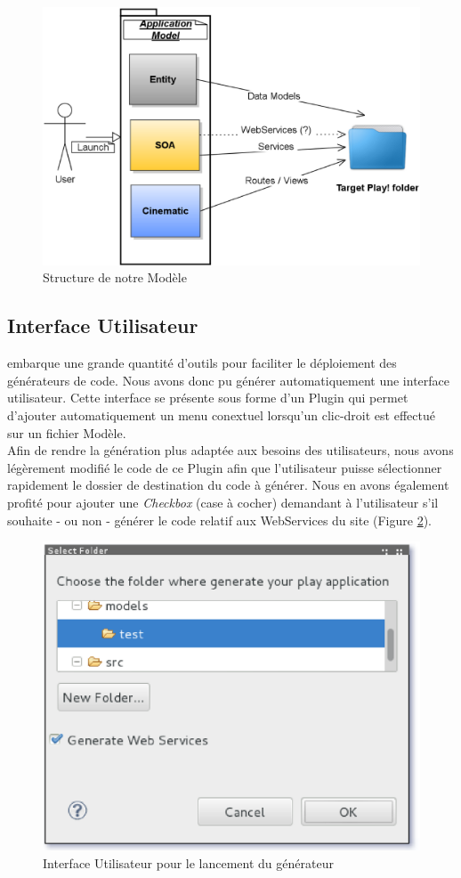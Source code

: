\begin{figure}[htb]
  \centering
  \includegraphics[scale=0.4]{img/application_scheme.eps}
  \caption{Structure de notre Modèle }
  \label{fig:application}
\end{figure}


\subsection{Interface Utilisateur}

\kwacceleo embarque une grande quantité d'outils pour faciliter le déploiement des générateurs de code. Nous avons donc pu générer automatiquement une interface utilisateur. Cette interface se présente sous forme d'un Plugin \kweclipse qui permet d'ajouter automatiquement un menu conextuel  lorsqu'un clic-droit est effectué sur un fichier Modèle.
\\
Afin de rendre la génération plus adaptée aux besoins des utilisateurs, nous avons légèrement modifié le code de ce Plugin afin que l'utilisateur puisse sélectionner rapidement le dossier de destination du code à générer. Nous en avons également profité pour ajouter une \textit{Checkbox} (case à cocher) demandant à l'utilisateur s'il souhaite - ou non - générer le code relatif aux WebServices du site \kwplay (Figure \ref{fig:ui}).

\begin{figure}[htb]
  \centering
  \includegraphics[scale=0.7]{img/screen_ui.eps}
  \caption{Interface Utilisateur pour le lancement du générateur}
  \label{fig:ui}
\end{figure}